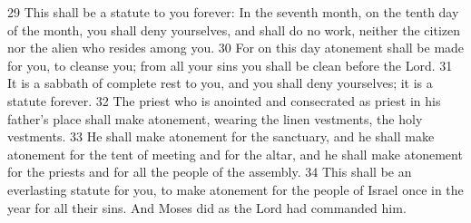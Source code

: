29 This shall be a statute to you forever: In the seventh month, on the tenth 
day of the month, you shall deny yourselves, and shall do no work, neither 
the citizen nor the alien who resides among you. 30 For on this day atonement 
shall be made for you, to cleanse you; from all your sins you shall be clean 
before the Lord. 31 It is a sabbath of complete rest to you, and you shall deny
yourselves; it is a statute forever. 32 The priest who is anointed and 
consecrated as priest in his father's place shall make atonement, wearing the 
linen vestments, the holy vestments. 33 He shall make atonement for the sanctuary, 
and he shall make atonement for the tent of meeting and for the altar, and he 
shall make atonement for the priests and for all the people of the assembly. 
34 This shall be an everlasting statute for you, to make atonement for the 
people of Israel once in the year for all their sins. And Moses did as the Lord
had commanded him.
